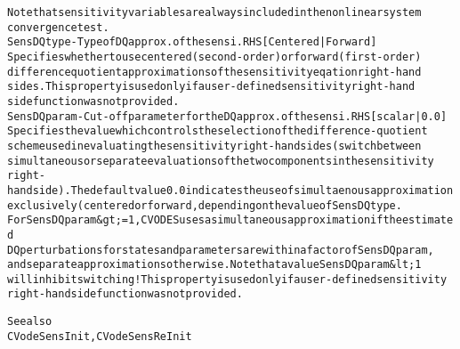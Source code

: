 \begin{alltt}
   Note that sensitivity variables are always included in the nonlinear system
   convergence test.
SensDQtype - Type of DQ approx. of the sensi. RHS [{Centered} | Forward ]
   Specifies whether to use centered (second-order) or forward (first-order)
   difference quotient approximations of the sensitivity eqation right-hand
   sides. This property is used only if a user-defined sensitivity right-hand
   side function was not provided.
SensDQparam - Cut-off parameter for the DQ approx. of the sensi. RHS [ scalar | {0.0} ]
   Specifies the value which controls the selection of the difference-quotient
   scheme used in evaluating the sensitivity right-hand sides (switch between
   simultaneous or separate evaluations of the two components in the sensitivity
   right-hand side). The default value 0.0 indicates the use of simultaenous approximation
   exclusively (centered or forward, depending on the value of SensDQtype.
   For SensDQparam &gt;= 1, CVODES uses a simultaneous approximation if the estimated
   DQ perturbations for states and parameters are within a factor of SensDQparam,
   and separate approximations otherwise. Note that a value SensDQparam &lt; 1
   will inhibit switching! This property is used only if a user-defined sensitivity
   right-hand side function was not provided.

   See also
        CVodeSensInit, CVodeSensReInit
\end{alltt}






\vspace{0.1in}